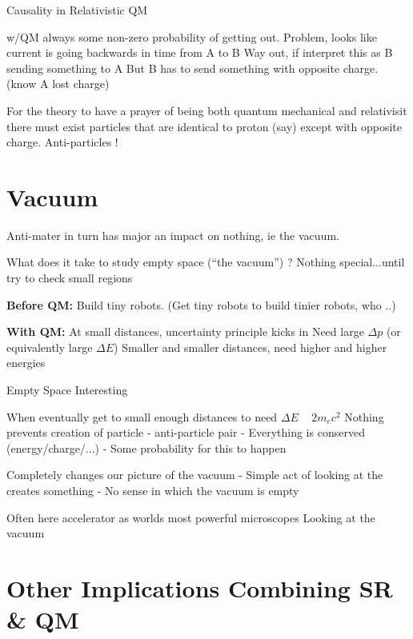 Causality in Relativistic QM

w/QM always some non-zero probability of getting out.
Problem, looks like current is going backwards in time from A to B
Way out, if interpret this as B sending something to A
But B has to send something with opposite charge. (know A lost charge)


For the theory to have a prayer of being both quantum mechanical and relativisit there must exist particles that are identical to proton (say) except with opposite charge.
Anti-particles !

\section{Vacuum}
Anti-mater in turn has major an impact on nothing, ie the vacuum.

What does it take to study empty space (“the vacuum”) ?
Nothing special...until try to check small regions

\textbf{Before QM:}
Build tiny robots. (Get tiny robots to build tinier robots, who ..)

\textbf{With QM:}
At small distances, uncertainty principle kicks in
Need large $\Delta p$ (or equivalently large $\Delta E$)
Smaller and smaller distances, need higher and higher energies


Empty Space Interesting

When eventually get to small enough distances to need $\Delta E$ ~ 2$m_e c^2$
Nothing prevents creation of particle - anti-particle pair
- Everything is conserved (energy/charge/...) - Some probability for this to happen

Completely changes our picture of the vacuum
- Simple act of looking at the creates something - No sense in which the vacuum is empty

Often here accelerator as worlds most powerful microscopes
Looking at the vacuum


\section{Other Implications Combining SR \& QM}

